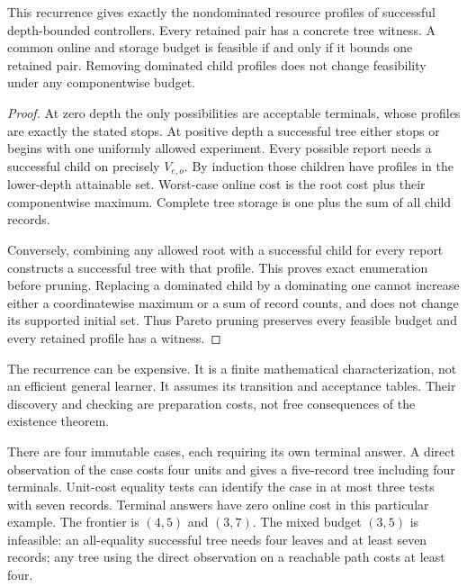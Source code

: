 \begin{theorem}\label{r:inquiry}
This recurrence gives exactly the nondominated resource profiles of successful depth-bounded controllers. Every retained pair has a concrete tree witness. A common online and storage budget is feasible if and only if it bounds one retained pair. Removing dominated child profiles does not change feasibility under any componentwise budget.
\end{theorem}
\begin{proof}
At zero depth the only possibilities are acceptable terminals, whose profiles are exactly the stated stops. At positive depth a successful tree either stops or begins with one uniformly allowed experiment. Every possible report needs a successful child on precisely $V_{e,o}$. By induction those children have profiles in the lower-depth attainable set. Worst-case online cost is the root cost plus their componentwise maximum. Complete tree storage is one plus the sum of all child records.

Conversely, combining any allowed root with a successful child for every report constructs a successful tree with that profile. This proves exact enumeration before pruning. Replacing a dominated child by a dominating one cannot increase either a coordinatewise maximum or a sum of record counts, and does not change its supported initial set. Thus Pareto pruning preserves every feasible budget and every retained profile has a witness.
\end{proof}

The recurrence can be expensive. It is a finite mathematical characterization, not an efficient general learner. It assumes its transition and acceptance tables. Their discovery and checking are preparation costs, not free consequences of the existence theorem.

\begin{counterexample}\label{ce:pareto}
There are four immutable cases, each requiring its own terminal answer. A direct observation of the case costs four units and gives a five-record tree including four terminals. Unit-cost equality tests can identify the case in at most three tests with seven records. Terminal answers have zero online cost in this particular example. The frontier is $(4,5)$ and $(3,7)$. The mixed budget $(3,5)$ is infeasible: an all-equality successful tree needs four leaves and at least seven records; any tree using the direct observation on a reachable path costs at least four.
\end{counterexample}

